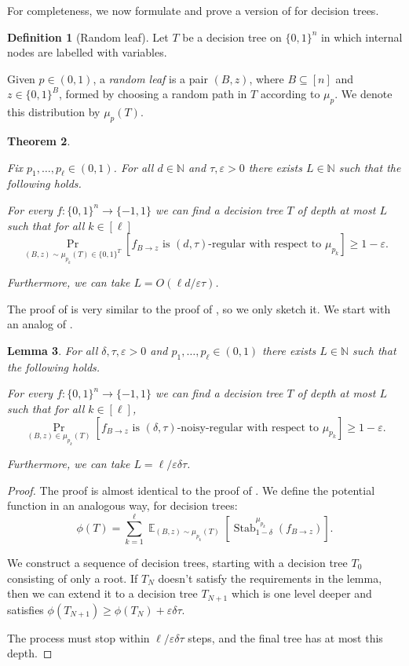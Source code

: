 \documentclass{article}
\newtheorem{theorem}{Theorem}[section]
\newtheorem{lemma}[theorem]{Lemma}
\theoremstyle{definition}
\newtheorem{definition}[theorem]{Definition}
\theoremstyle{remark}
\DeclareMathOperator*{\E}{\mathbb{E}}
\DeclareMathOperator{\Stab}{Stab}
\newcommand\eps{\varepsilon}
\renewcommand\epsilon{\eps}
\renewcommand\geq{\geqslant}
\begin{document}

\medskip

For completeness, we now formulate and prove a version of  for decision trees.

\begin{definition}[Random leaf] \label{def:random-leaf}
Let $T$ be a decision tree on $\{0,1\}^n$ in which internal nodes are labelled with variables.

Given $p \in (0,1)$, a \emph{random leaf} is a pair $(B,z)$, where $B \subseteq [n]$ and $z \in \{0,1\}^B$, formed by choosing a random path in $T$ according to $\mu_p$. We denote this distribution by $\mu_p(T)$.
\end{definition}

\begin{theorem}
\label{thm:jones-dt}

Fix $p_1,\ldots,p_\ell \in (0,1)$. For all $d \in \mathbb{N}$ and $\tau,\epsilon > 0$ there exists $L \in \mathbb{N}$ such that the following holds.

For every $f\colon \{0,1\}^n \to \{-1,1\}$ we can find a decision tree $T$ of depth at most $L$ such that for all $k \in [\ell]$
\[
 \Pr_{(B,z) \sim \mu_{p_k}(T) \in \{0,1\}^T}[f_{B \to z} \text{ is $(d,\tau)$-regular with respect to $\mu_{p_k}$}] \geq 1-\epsilon.
\]

Furthermore, we can take $L = O(\ell d/\epsilon\tau)$.
\end{theorem}

The proof of  is very similar to the proof of , so we only sketch it. We start with an analog of .
\begin{lemma} \label{lem:jones-noisy-influences-dt}
For all $\delta,\tau,\epsilon > 0$ and $p_1,\ldots,p_\ell \in (0,1)$ there exists $L \in \mathbb{N}$ such that the following holds.

For every $f\colon \{0,1\}^n \to \{-1,1\}$ we can find a decision tree $T$ of depth at most $L$ such that for all $k \in [\ell]$,
\[
 \Pr_{(B,z) \in \mu_{p_k}(T)}[f_{B \to z} \text{ is $(\delta,\tau)$-noisy-regular with respect to $\mu_{p_k}$}] \geq 1-\epsilon.
\]

Furthermore, we can take $L = \ell/\epsilon\delta\tau$.
\end{lemma}
\begin{proof}
The proof is almost identical to the proof of . We define the potential function in an analogous way, for decision trees:
\[
 \phi(T) = \sum_{k=1}^\ell \E_{(B,z) \sim \mu_{p_k}(T)}[\Stab_{1-\delta}^{\mu_{p_k}}(f_{B\to z})].
\]

We construct a sequence of decision trees, starting with a decision tree $T_0$ consisting of only a root. If $T_N$ doesn't satisfy the requirements in the lemma, then we can extend it to a decision tree $T_{N+1}$ which is one level deeper and satisfies $\phi(T_{N+1}) \geq \phi(T_N) + \epsilon\delta\tau$.

The process must stop within $\ell/\epsilon\delta\tau$ steps, and the final tree has at most this depth.
\end{proof}
\end{document}
